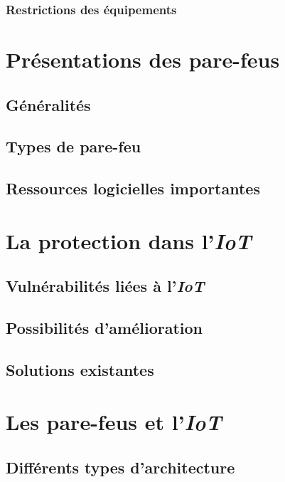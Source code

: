 \documentclass[]{article}
\begin{document}
\subsubsection{Restrictions des équipements}

\newpage
\section{Présentations des pare-feus}

\subsection{Généralités}

\subsection{Types de pare-feu}

\subsection{Ressources logicielles importantes}

\newpage
\section{La protection dans l'\textit{IoT}}

\subsection{Vulnérabilités liées à l'\textit{IoT}}

\subsection{Possibilités d'amélioration}

\subsection{Solutions existantes}

\newpage
\section{Les pare-feus et l'\textit{IoT}}

\subsection{Différents types d'architecture}
\end{document}
